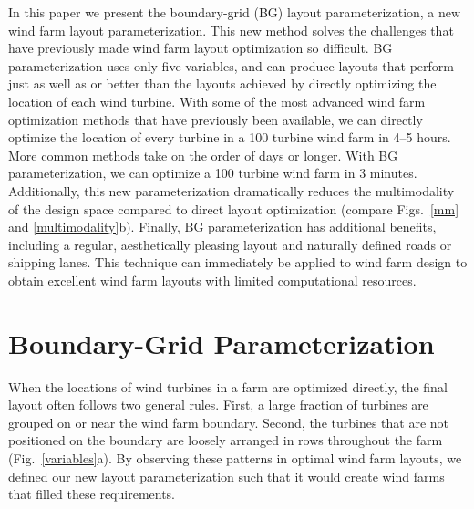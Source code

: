 \documentclass[wes, manuscript]{copernicus}
\begin{document}
In this paper we present the boundary-grid (BG) layout parameterization, a new wind farm layout parameterization. This new method solves the challenges that have previously made wind farm layout optimization so difficult. BG parameterization uses only five variables, and can produce layouts that perform just as well as or better than the layouts achieved by directly optimizing the location of each wind turbine. 
With some of the most advanced wind farm optimization methods that have previously been available, we can directly optimize the location of every turbine in a 100 turbine wind farm in 4--5 hours. More common methods take on the order of days or longer. With BG parameterization, we can optimize a 100 turbine wind farm in 3 minutes. Additionally, this new parameterization dramatically reduces the multimodality of the design space compared to direct layout optimization (compare Figs.~\ref{mm} and \ref{multimodality}b). Finally, BG parameterization has additional benefits, including a regular, aesthetically pleasing layout and naturally defined roads or shipping lanes. This technique can immediately be applied to wind farm design to obtain excellent wind farm layouts with limited computational resources.


\section{Boundary-Grid Parameterization}
When the locations of wind turbines in a farm are optimized directly, the final layout often follows two general rules. First, a large fraction of turbines are grouped on or near the wind farm boundary. Second, the turbines that are not positioned on the boundary are loosely arranged in rows throughout the farm (Fig.~\ref{variables}a). 
By observing these patterns in optimal wind farm layouts, we defined our new layout parameterization such that it would create wind farms that filled these requirements.
\end{document}
